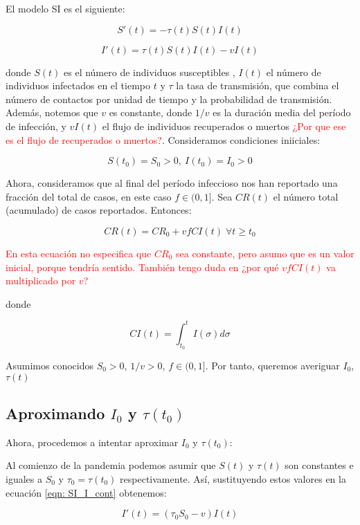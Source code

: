 El modelo SI es el siguiente:

\begin{equation}
\label{eqn: SI_S_cont}
S'(t) = -\tau (t)S(t)I(t)
\end{equation}


\begin{equation}
\label{eqn: SI_I_cont}
I'(t) = \tau (t)S(t)I(t) -vI(t)
\end{equation}

donde $S(t)$ es el número de individuos susceptibles , $I(t)$ el número de individuos infectados en el tiempo $t$ y $\tau$ la tasa de transmisión, que combina el número de contactos por unidad de tiempo y la probabilidad de transmisión. Además, notemos que $v$ es constante, donde $1/v$ es la duración media del período de infección, y $vI(t)$ el flujo de individuos recuperados o muertos \textcolor{red}{¿Por que ese es el flujo de recuperados o muertos?}. Consideramos condiciones iniiciales:

$$S(t_0)=S_0>0, \: I(t_0)=I_0>0$$

Ahora, consideramos que al final del período infeccioso nos han reportado una fracción del total de casos, en este caso $f\in (0,1]$. Sea $CR(t)$ el número total (acumulado) de casos reportados. Entonces:

\begin{equation}
\label{eqn: acumulada}
CR(t) = CR_0 + vfCI(t) \; \forall t \geq t_0
\end{equation}

\textcolor{red}{En esta ecuación no especifica que $CR_0$ sea constante, pero asumo que es un valor inicial, porque tendría sentido. También tengo duda en ¿por qué $vfCI(t)$ va multiplicado por $v$?}

donde

$$CI(t) = \int_{t_0}^t I(\sigma ) d\sigma $$

Asumimos conocidos $S_0 > 0$, $1/v>0$, $f\in (0,1]$. Por tanto, queremos averiguar $I_0$, $\tau (t)$

\subsection{Aproximando $I_0$ y $\tau (t_0)$}
Ahora, procedemos a intentar aproximar $I_0$ y $\tau (t_0)$:

Al comienzo de la pandemia podemos asumir que $S(t)$ y $\tau (t)$ son constantes e iguales a $S_0$ y $\tau_0 = \tau (t_0)$ respectivamente. Así, sustituyendo estos valores en la ecuación \ref{eqn: SI_I_cont} obtenemos:

$$I'(t) = (\tau_0 S_0 -v) I(t)$$








